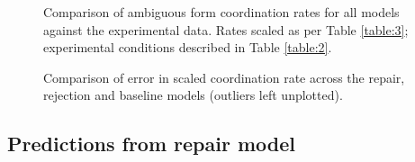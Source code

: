 \documentclass[12pt,a4paper]{article}
\begin{document}
\begin{figure}
\centering
\scalebox{.7}{}
\caption{Comparison of ambiguous form coordination rates for all models against the experimental data. Rates scaled as per Table \ref{table:3}; experimental conditions described in Table \ref{table:2}.}
\label{fig:model_comp}
\end{figure}

\begin{figure}
\centering
\scalebox{.725}{}
\caption{Comparison of error in scaled coordination rate across the repair, rejection and baseline models (outliers left unplotted).}
\label{fig:2}
\end{figure}

%

\subsection{Predictions from repair model}
\end{document}
